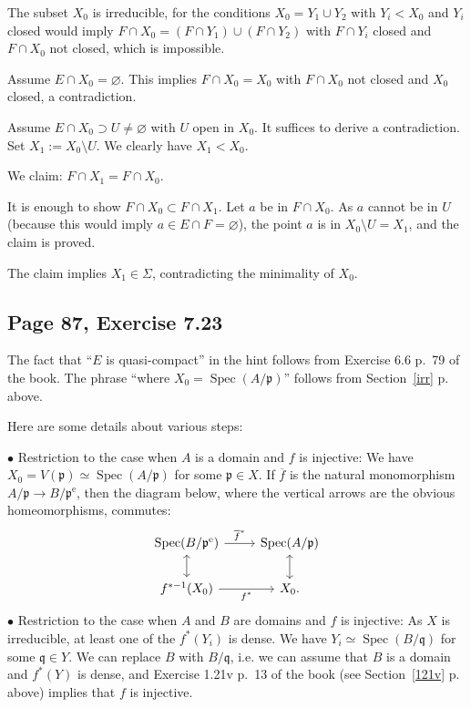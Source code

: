 \documentclass[parskip=half,fontsize=12pt]{scrartcl}%
\newcommand{\oo}{\operatorname}\newcommand{\ooo}{\operatorname*}
\newcommand{\mf}{\mathfrak}
\newcommand{\ppp}{\mf p}
\newcommand{\qqq}{\mf q}
\newcommand{\bu}{\bullet}
\newcommand{\Spec}{\operatorname{Spec}}\newcommand{\Sp}{\operatorname{Spec}}
\begin{document}
The subset $X_0$ is irreducible, for the conditions $X_0=Y_1\cup Y_2$ with $Y_i<X_0$ and $Y_i$ closed would imply $F\cap X_0=(F\cap Y_1)\cup(F\cap Y_2)$ with $F\cap Y_i$ closed and $F\cap X_0$ not closed, which is impossible.

Assume $E\cap X_0=\varnothing$. This implies $F\cap X_0=X_0$ with $F\cap X_0$ not closed and $X_0$ closed, a contradiction.

Assume $E\cap X_0\supset U\ne\varnothing$ with $U$ open in $X_0$. It suffices to derive a contradiction. Set $X_1:=X_0\setminus U$. We clearly have $X_1<X_0$. 

We claim: $F\cap X_1=F\cap X_0$. 

It is enough to show $F\cap X_0\subset F\cap X_1$. Let $a$ be in $F\cap X_0$. As $a$ cannot be in $U$ (because this would imply $a\in E\cap F=\varnothing$), the point $a$ is in $X_0\setminus U=X_1$, and the claim is proved.

The claim implies $X_1\in\Sigma$, contradicting the minimality of $X_0$.

\subsection{Page 87, Exercise 7.23}%

The fact that ``$E$ is quasi-compact'' in the hint follows from Exercise 6.6 p.~79 of the book. The phrase ``where $X_0=\Spec(A/\ppp)$'' follows from Section~\ref{irr} p.~\pageref{irr} above. %

Here are some details about various steps:

$\bu$ Restriction to the case when $A$ is a domain and $f$ is injective: We have $X_0=V(\ppp)\simeq\Spec(A/\ppp)$ for some $\ppp\in X$. If $\overline f$ is the natural monomorphism $A/\ppp\to B/\ppp^{\oo e}$, then the diagram below, where the vertical arrows are the obvious homeomorphisms, commutes: 
$$
\begin{tikzcd}
\Spec(B/\ppp^{\oo e})\ar[r,"\overline f^*"]\ar[d,leftrightarrow]&\Spec(A/\ppp)\ar[d,leftrightarrow]\\ 
f^{*-1}(X_0)\ar[r,"f^*"']&X_0.
\end{tikzcd}
$$ 
$\bu$ Restriction to the case when $A$ and $B$ are domains and $f$ is injective: As $X$ is irreducible, at least one of the $f^*(Y_i)$ is dense. We have $Y_i\simeq\Spec(B/\qqq)$ for some $\qqq\in Y$. We can replace $B$ with $B/\qqq$, i.e. we can assume that $B$ is a domain and $f^*(Y)$ is dense, and Exercise 1.21v p.~13 of the book (see Section~\ref{121v} p.~\pageref{121v} above) implies that $f$ is injective. 
\end{document}

